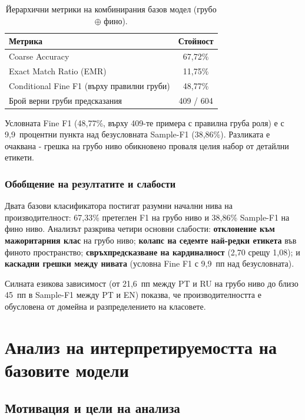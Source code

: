 \documentclass[12pt,a4paper]{report}
\begin{document}
\begin{table}[H]
\centering
\caption{Йерархични метрики на комбинирания базов модел (грубо $\oplus$ фино).}
\label{tab:hierarchical}
\begin{tabular}{lc}
\toprule
\textbf{Метрика} & \textbf{Стойност} \\
\midrule
Coarse Accuracy & 67,72\% \\
Exact Match Ratio (EMR) & 11,75\% \\
Conditional Fine F1 (върху правилни груби) & 48,77\% \\
Брой верни груби предсказания & 409 / 604 \\
\bottomrule
\end{tabular}
\end{table}

Условната Fine F1 (48,77\%, върху 409-те примера с правилна груба роля) е с 9,9~процентни пункта над безусловната Sample-F1 (38,86\%). Разликата е очаквана - грешка на грубо ниво обикновено проваля целия набор от детайлни етикети.

\subsection{Обобщение на резултатите и слабости}

Двата базови класификатора постигат разумни начални нива на производителност: 67,33\% претеглен F1 на грубо ниво и 38,86\% Sample-F1 на фино ниво. Анализът разкрива четири основни слабости: \textbf{отклонение към мажоритарния клас} на грубо ниво; \textbf{колапс на седемте най-редки етикета} във финото пространство; \textbf{свръхпредсказване на кардиналност} (2,70 срещу 1,08); и \textbf{каскадни грешки между нивата} (условна Fine F1 с 9,9~пп над безусловната).

Силната езикова зависимост (от 21,6~пп между PT и RU на грубо ниво до близо 45~пп в Sample-F1 между PT и EN) показва, че производителността е обусловена от домейна и разпределението на класовете.


\chapter{Анализ на интерпретируемостта на базовите модели}

\section{Мотивация и цели на анализа}
\end{document}
